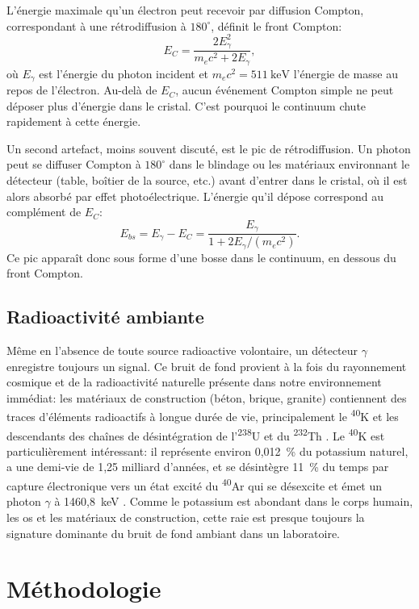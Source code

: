 \documentclass[11pt,letterpaper]{article}
\newcommand{\beq}[1]{\begin{equation} \label{#1}}
\def\enq{\end{equation}}
\begin{document}
L'énergie maximale qu'un électron peut recevoir par diffusion Compton, correspondant à une rétrodiffusion à $180^\circ$, définit le front Compton:
\beq{eq:compton_edge}
    E_C = \frac{2E_\gamma^2}{m_e c^2 + 2E_\gamma} ,
\enq
où $E_\gamma$ est l'énergie du photon incident et $m_e c^2 = 511~\text{keV}$ l'énergie de masse au repos de l'électron. Au-delà de $E_C$, aucun événement Compton simple ne peut déposer plus d'énergie dans le cristal. C'est pourquoi le continuum chute rapidement à cette énergie.

Un second artefact, moins souvent discuté, est le pic de rétrodiffusion. Un photon peut se diffuser Compton à $180^\circ$ dans le blindage ou les matériaux environnant le détecteur (table, boîtier de la source, etc.) avant d'entrer dans le cristal, où il est alors absorbé par effet photoélectrique. L'énergie qu'il dépose correspond au complément de $E_C$:
\beq{eq:backscatter}
    E_{bs} = E_\gamma - E_C = \frac{E_\gamma}{1 + 2E_\gamma / (m_e c^2)} .
\enq
Ce pic apparaît donc sous forme d'une bosse dans le continuum, en dessous du front Compton.

\subsection{Radioactivité ambiante}

Même en l'absence de toute source radioactive volontaire, un détecteur $\gamma$ enregistre toujours un signal. Ce bruit de fond provient à la fois du rayonnement cosmique et de la radioactivité naturelle présente dans notre environnement immédiat: les matériaux de construction (béton, brique, granite) contiennent des traces d'éléments radioactifs à longue durée de vie, principalement le \textsuperscript{40}K et les descendants des chaînes de désintégration de l'\textsuperscript{238}U et du \textsuperscript{232}Th \cite{unscear}. Le \textsuperscript{40}K est particulièrement intéressant: il représente environ 0,012~\% du potassium naturel, a une demi-vie de 1,25 milliard d'années, et se désintègre 11~\% du temps par capture électronique vers un état excité du \textsuperscript{40}Ar qui se désexcite et émet un photon $\gamma$ à 1460,8~keV \cite{nndc}. Comme le potassium est abondant dans le corps humain, les os et les matériaux de construction, cette raie est presque toujours la signature dominante du bruit de fond ambiant dans un laboratoire.

\section{Méthodologie}
\label{sec:methodologie}
\end{document}
